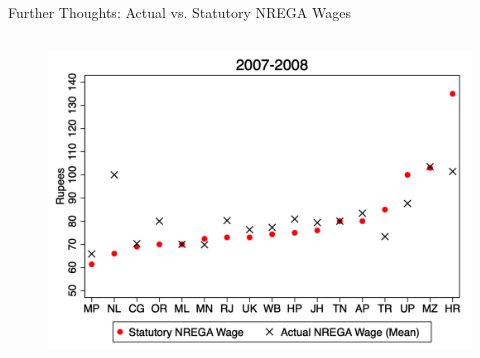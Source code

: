 \begin{frame}{Further Thoughts: Actual vs. Statutory NREGA Wages}
    \begin{columns}[T]
        \begin{column}{0.6\textwidth}
            \begin{figure}
            \centering
            \includegraphics[height = 0.7 \textheight]{images/survey_accuracy.png}
            \end{figure}
        \end{column}
        

\end{columns}
\end{frame}
